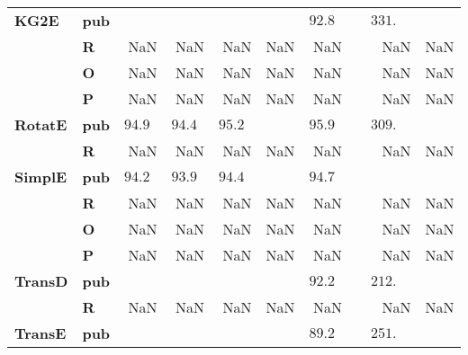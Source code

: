 \begin{tabular}{llrrrrrrr}
\textbf{KG2E} & \textbf{pub} &                    &                    &                    &             &  $92.8\phantom{0}$ &  $\phantom{00}331.\phantom{00}$ &          \\
       & \textbf{R} &                NaN &                NaN &                NaN &         NaN &                NaN &                             NaN &      NaN \\
       & \textbf{O} &                NaN &                NaN &                NaN &         NaN &                NaN &                             NaN &      NaN \\
       & \textbf{P} &                NaN &                NaN &                NaN &         NaN &                NaN &                             NaN &      NaN \\\midrule
\textbf{RotatE} & \textbf{pub} &  $94.9\phantom{0}$ &  $94.4\phantom{0}$ &  $95.2\phantom{0}$ &             &  $95.9\phantom{0}$ &  $\phantom{00}309.\phantom{00}$ &          \\
       & \textbf{R} &                NaN &                NaN &                NaN &         NaN &                NaN &                             NaN &      NaN \\\midrule
\textbf{SimplE} & \textbf{pub} &  $94.2\phantom{0}$ &  $93.9\phantom{0}$ &  $94.4\phantom{0}$ &             &  $94.7\phantom{0}$ &                                 &          \\
       & \textbf{R} &                NaN &                NaN &                NaN &         NaN &                NaN &                             NaN &      NaN \\
       & \textbf{O} &                NaN &                NaN &                NaN &         NaN &                NaN &                             NaN &      NaN \\
       & \textbf{P} &                NaN &                NaN &                NaN &         NaN &                NaN &                             NaN &      NaN \\\midrule
\textbf{TransD} & \textbf{pub} &                    &                    &                    &             &  $92.2\phantom{0}$ &  $\phantom{00}212.\phantom{00}$ &          \\
       & \textbf{R} &                NaN &                NaN &                NaN &         NaN &                NaN &                             NaN &      NaN \\\midrule
\textbf{TransE} & \textbf{pub} &                    &                    &                    &             &  $89.2\phantom{0}$ &  $\phantom{00}251.\phantom{00}$ &          \\

\end{tabular}
